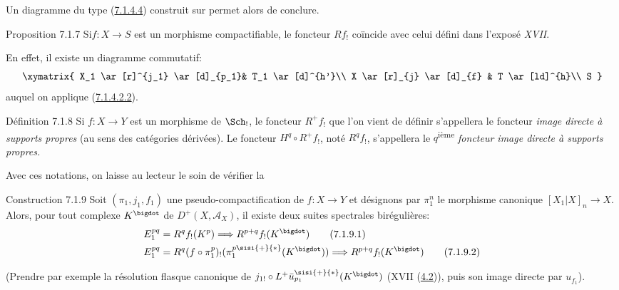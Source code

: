 \documentclass[10pt]{../fichiers-configuration-latex/smfart}
\begin{document}
Un diagramme du type (\hyperref[XVII.par7.1.4.4]{7.1.4.4}) construit sur
 permet alors de conclure.

\begin{enonce*}{Proposition 7.1.7}
Si\pageoriginale $f:X\rightarrow S$ est un morphisme compactifiable,
le foncteur $Rf_{!}$ coïncide avec celui défini dans l'exposé \emph{XVII}.
\end{enonce*}

En effet, il existe un diagramme commutatif:
\[
\xymatrix{
X_1         \ar[r]^{j_1} \ar[d]_{p_1}& T_1 \ar[d]^{h'}\\
X           \ar[r]_{j}  \ar[d]_{f} & T \ar[ld]^{h}\\
S
}
\]
auquel on applique (\hyperref[XVII.lem7.1.4.2.2]{7.1.4.2.2}).

\begin{enonce*}{Définition 7.1.8}
Si $f:X\rightarrow Y$ est un morphisme de $\Sch_{!}$, le foncteur
$R^{+}f_{!}$ que l'on vient de définir s'appellera le foncteur \emph{image
directe à supports propres} (au sens des catégories dérivées). Le
foncteur $H^{q}\circ R^{+}f_{!}$, noté $R^{q}f_{!}$, s'appellera le
$q$\textsuperscript{ième} \emph{foncteur image directe à supports propres.}
\end{enonce*}

Avec ces notations, on laisse au lecteur le soin de vérifier la

\begin{enonce*}{Construction 7.1.9}
Soit $(\pi_{1}, j_{1}, f_{1})$ une pseudo-compactification de
$f:X\rightarrow Y$ et désignons par $\pi^{n}_{1}$ le morphisme
canonique $[X_{1}|X]_{n}\rightarrow X$. Alors, pour tout complexe
$K^{\bigdot}$ de $D^{+}(X,\mathcal{A}_{X})$, il existe deux suites
spectrales birégulières:
\begin{align*}
E^{pq}_{1} &= R^{q}f_{!}(K^{p})\Longrightarrow R^{p+q}
f_{!}(K^{\bigdot})\tag{7.1.9.1}\\
E^{pq}_{1} &= R^{q}(f\circ
\pi^{p}_{1})_{!}(\pi^{p\sisi{+}{*}}_{1}(K^{\bigdot}))\Longrightarrow
R^{p+q}f_{!}(K^{\bigdot})\tag{7.1.9.2}
\end{align*}
\end{enonce*}

(Prendre par exemple la résolution flasque canonique de $j_{1!}\circ
L^{+}\bar{u}_{p_{1}}^{\sisi{+}{*}}(K^{\bigdot})$ (\cf XVII (\hyperref[XVII.subsec4.2]{4.2})), puis son
image directe par $u_{f_{1}}$).
\end{document}

